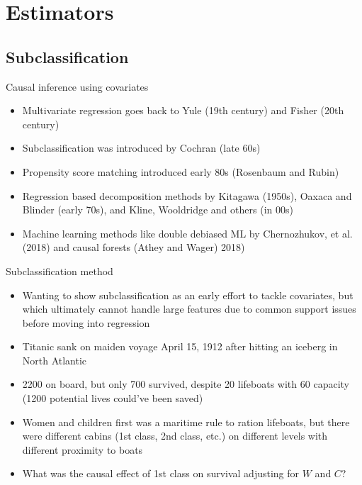 \documentclass{beamer}
\begin{document}
\section{Estimators }


\subsection{Subclassification}

\begin{frame}{Causal inference using covariates}
\begin{itemize}

\item Multivariate regression goes back to Yule (19th century) and Fisher (20th century)
\item Subclassification was introduced by Cochran (late 60s)
\item Propensity score matching introduced early 80s (Rosenbaum and Rubin)
\item Regression based decomposition methods by Kitagawa (1950s), Oaxaca and Blinder (early 70s), and Kline, Wooldridge and others (in 00s)
\item Machine learning methods like double debiased ML by Chernozhukov, et al. (2018) and causal forests (Athey and Wager) 2018)
\end{itemize}

\end{frame}


\begin{frame}{Subclassification method}

\begin{itemize}

\item Wanting to show subclassification as an early effort to tackle covariates, but which ultimately cannot handle large features due to common support issues before moving into regression 
\item Titanic sank on maiden voyage April 15, 1912 after hitting an iceberg in North Atlantic
\item 2200 on board, but only 700 survived, despite 20 lifeboats with 60 capacity (1200 potential lives could've been saved)
\item Women and children first was a maritime rule to ration lifeboats, but there were different cabins (1st class, 2nd class, etc.) on different levels with different proximity to boats
\item What was the causal effect of 1st class on survival adjusting for $W$ and $C$?
\end{itemize}

\end{frame}
\end{document}
